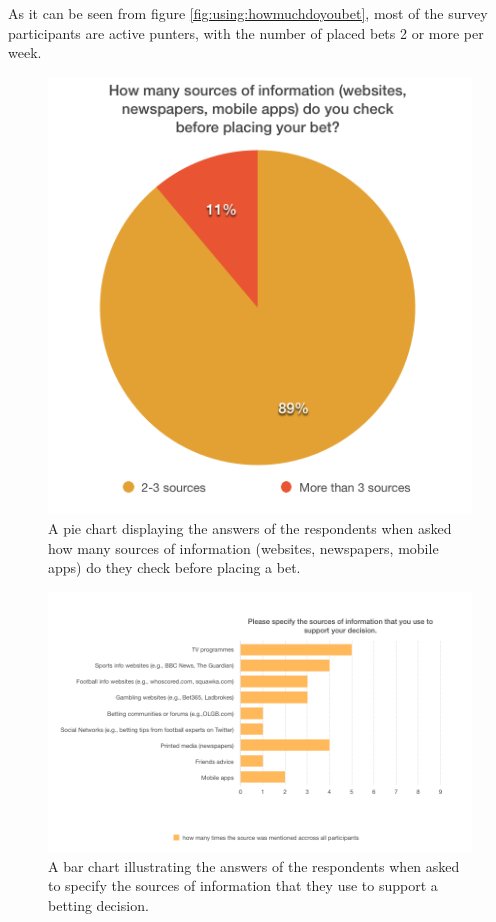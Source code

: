 As it can be seen from figure \ref{fig:using:howmuchdoyoubet}, most of the survey participants are active punters, with the number of placed bets 2 or more per week. 

\begin{figure}[H]
	\begin{center}
		\includegraphics[width=.50\columnwidth]{req/images/howManySources.png}
		\caption{A pie chart displaying the answers of the respondents when asked how many sources of information (websites, newspapers, mobile apps) do they check before placing a bet.} 
		\label{fig:using:howmanysources}
	\end{center}
\end{figure}

\begin{figure}[H]
	\begin{center}
		\includegraphics[width=1.0\columnwidth]{req/images/listTheSources.png}
		\caption{A bar chart illustrating the answers of the respondents when asked to specify the sources of information that they use to support a betting decision.} 
		\label{fig:using:llistthesources}
	\end{center}
\end{figure}

